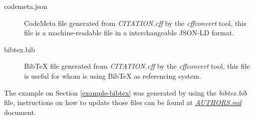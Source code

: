 \documentclass{article}
\begin{document}
\begin{description}
  \item[codemeta.json] CodeMeta file generated from {\em CITATION.cff} by the
    {\em cffconvert} tool, this file is a machine-readable file in a
    interchangeable JSON-LD format.
  \item[bibtex.bib] BibTeX file generated from {\em CITATION.cff} by the {\em
    cffconvert} tool, this file is useful for whom is using BibTeX as referencing
    system.
\end{description}

The example on Section \ref{example-bibtex} was generated by using the {\em
bibtex.bib} file, instructions on how to update those files can be found at
\href{https://github.com/cortext/how-to-cite-cortext/blob/main/AUTHORS.md}{\em AUTHORS.md}
document.

\printbibliography
\end{document}

